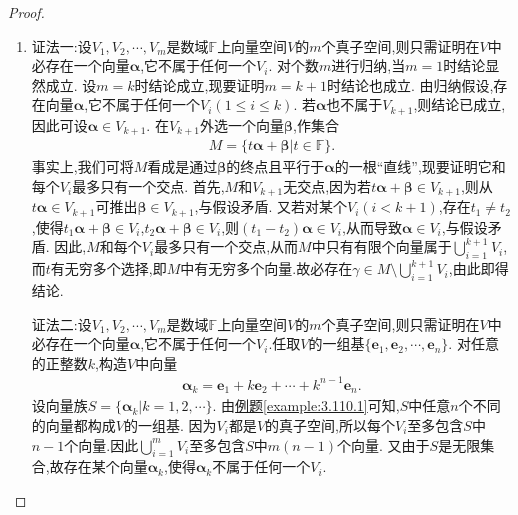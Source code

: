 \documentclass[../../main.tex]{subfiles}%
\begin{document}
\begin{proof}
\begin{enumerate}[(1)]
\item {\color{blue}证法一:}设\(V_1,V_2,\cdots,V_m\)是数域\(\mathbb{F}\)上向量空间\(V\)的\(m\)个真子空间,则只需证明在\(V\)中必存在一个向量\(\boldsymbol{\alpha}\),它不属于任何一个\(V_i\).
对个数\(m\)进行归纳,当\(m = 1\)时结论显然成立. 设\(m = k\)时结论成立,现要证明\(m = k + 1\)时结论也成立. 由归纳假设,存在向量\(\boldsymbol{\alpha}\),它不属于任何一个\(V_i(1\leqslant  i\leqslant  k)\). 若\(\boldsymbol{\alpha}\)也不属于\(V_{k + 1}\),则结论已成立,因此可设\(\boldsymbol{\alpha}\in V_{k + 1}\). 在\(V_{k + 1}\)外选一个向量\(\boldsymbol{\beta}\),作集合
\begin{align*}
M = \{t\boldsymbol{\alpha}+\boldsymbol{\beta}|t\in\mathbb{F}\}.
\end{align*}
事实上,我们可将\(M\)看成是通过\(\boldsymbol{\beta}\)的终点且平行于\(\boldsymbol{\alpha}\)的一根“直线”,现要证明它和每个\(V_i\)最多只有一个交点. 首先,\(M\)和\(V_{k + 1}\)无交点,因为若\(t\boldsymbol{\alpha}+\boldsymbol{\beta}\in V_{k + 1}\),则从\(t\boldsymbol{\alpha}\in V_{k + 1}\)可推出\(\boldsymbol{\beta}\in V_{k + 1}\),与假设矛盾. 又若对某个\(V_i(i<k + 1)\),存在\(t_1\neq t_2\),使得\(t_1\boldsymbol{\alpha}+\boldsymbol{\beta}\in V_i\),\(t_2\boldsymbol{\alpha}+\boldsymbol{\beta}\in V_i\),则\((t_1 - t_2)\boldsymbol{\alpha}\in V_i\),从而导致\(\boldsymbol{\alpha}\in V_i\),与假设矛盾. 因此,\(M\)和每个\(V_i\)最多只有一个交点,从而\(M\)中只有有限个向量属于\(\bigcup_{i=1}^{k+1}{V_i}\),而\(t\)有无穷多个选择,即$M$中有无穷多个向量.故必存在$\gamma\in M\setminus \bigcup_{i=1}^{k+1}{V_i}$,由此即得结论. 

{\color{blue}证法二:}设\(V_1,V_2,\cdots,V_m\)是数域\(\mathbb{F}\)上向量空间\(V\)的\(m\)个真子空间,则只需证明在\(V\)中必存在一个向量\(\boldsymbol{\alpha}\),它不属于任何一个\(V_i\).任取\(V\)的一组基\(\{\boldsymbol{e}_1,\boldsymbol{e}_2,\cdots,\boldsymbol{e}_n\}\). 对任意的正整数\(k\),构造\(V\)中向量
\begin{align*}
\boldsymbol{\alpha}_k=\boldsymbol{e}_1 + k\boldsymbol{e}_2+\cdots + k^{n - 1}\boldsymbol{e}_n.
\end{align*}
设向量族\(S = \{\boldsymbol{\alpha}_k|k = 1,2,\cdots\}\). 由\hyperref[example:3.110.1]{例题\ref{example:3.110.1}}可知,\(S\)中任意\(n\)个不同的向量都构成\(V\)的一组基. 因为\(V_i\)都是\(V\)的真子空间,所以每个\(V_i\)至多包含\(S\)中\(n - 1\)个向量.因此$\bigcup_{i=1}^m{V_i}$至多包含$S$中$m(n-1)$个向量.
又由于\(S\)是无限集合,故存在某个向量\(\boldsymbol{\alpha}_k\),使得\(\boldsymbol{\alpha}_k\)不属于任何一个\(V_i\).


\end{enumerate}
\end{proof}
\end{document}
